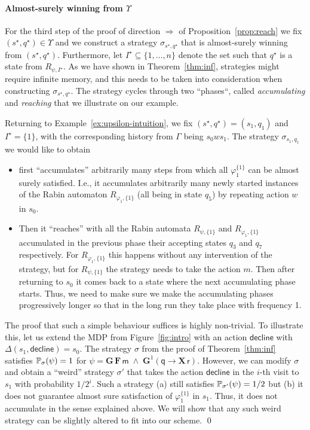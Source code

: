 \documentclass[a4paper,UKenglish]{lipics}
\newcommand{\Gf}[1]{\mathbf{G}^{#1}}
\newcommand{\X}{\mathbf{X}\,}
\newcommand{\G}{\mathbf{G}\,}
\newcommand{\F}{\mathbf{F}\,}
\renewcommand{\Pr}[3][]{\ifblank{#1}{\mathbb{P}_{#2}}{\mathbb{P}^{#1}_{#2}}(#3)}
\newcommand{\rabin}{R}
\newcommand{\fix}[1]{{#1^\star}}
\newcommand{\fixs}{\fix{s}}
\newcommand{\fixq}{\fix{q}}
\newcommand{\fixI}{\fix{I}}
\newcommand{\ap}[1]{\ensuremath{\mathsf{#1}}}
\begin{document}
\paragraph*{Almost-surely winning from $\Upsilon$}

For the third step of the proof of direction $\Rightarrow$ of Proposition~\ref{prop:reach} we fix $(\fixs,\fixq) \in \Upsilon$ and we construct a strategy $\sigma_{\fixs,\fixq}$ that is almost-surely winning from $(\fixs,\fixq)$. Furthermore, let $\fixI\subseteq\{1,\ldots,n\}$ denote the set such that $\fixq$ is a state from $\rabin_{\psi,\fixI}$. 
As we have shown in Theorem~\ref{thm:inf}, strategies might require infinite memory, and this needs to be taken into
consideration when constructing $\sigma_{\fixs,\fixq}$. The strategy cycles through two ``phases``, called {\em accumulating} and {\em reaching} that we illustrate on our example.

\begin{example}\label{ex:accum-intuition} 
	Returning to Example~\ref{ex:upsilon-intuition}, 
	we fix $(\fixs,\fixq) = (s_1,q_1)$ and $\fixI = \{1\}$, with the corresponding history from $\Gamma$ being $s_0 w s_1$. The strategy $\sigma_{s_1,q_1}$ we would like to obtain
	\begin{itemize} 
		\item first ``accumulates'' arbitrarily many steps from which all $\varphi_1^{\{1\}}$ can be almost surely satisfied. I.e., it accumulates arbitrarily many newly started instances of the Rabin automaton $\rabin_{\varphi_1,\{1\}}$ (all being in state $q_5$) by repeating action $w$ in $s_0$.
		\item Then it ``reaches'' with all the Rabin automata $\rabin_{\psi,\{1\}}$ and $\rabin_{\varphi_1,\{1\}}$ accumulated in the previous phase their accepting states $q_3$ and $q_7$ respectively. For $\rabin_{\varphi_1,\{1\}}$ this happens without any intervention of the strategy,
		but for $\rabin_{\psi,\{1\}}$ the strategy needs to take the action $m$. Then after returning to $s_0$ it comes back to a state where the next accumulating
		phase starts.
Thus, we need to make sure we make the accumulating phases progressively longer so that in the long run they take place with frequency 1.
	\end{itemize}
	The proof that such a simple behaviour suffices is highly non-trivial.
To illustrate this, let us extend the MDP from Figure~\ref{fig:intro} with an action \ap{decline} with $\Delta(s_1,\ap{decline})=s_0$.
	The strategy $\sigma$ from the proof of Theorem~\ref{thm:inf} satisfies $\Pr{\sigma}{\psi}=1$ for $\psi= \G\F \ap{m} \;\land\; \Gf{1} (\ap{q} \rightarrow \X \ap{r} )$.
However, we can modify $\sigma$ and obtain a ``weird'' strategy $\sigma'$ that takes the action \ap{decline} in the $i$-th visit to $s_1$ with probability $1/2^i$. Such a strategy (a) still satisfies $\Pr{\sigma'}{\psi}=1/2$ but (b) it does not guarantee almost sure satisfaction of $\varphi_1^{\{1\}}$ in $s_1$. Thus, it does not accumulate in the sense explained above. We will show that any such weird strategy can be slightly altered to fit into our scheme. \qed
\end{example}
\end{document}
